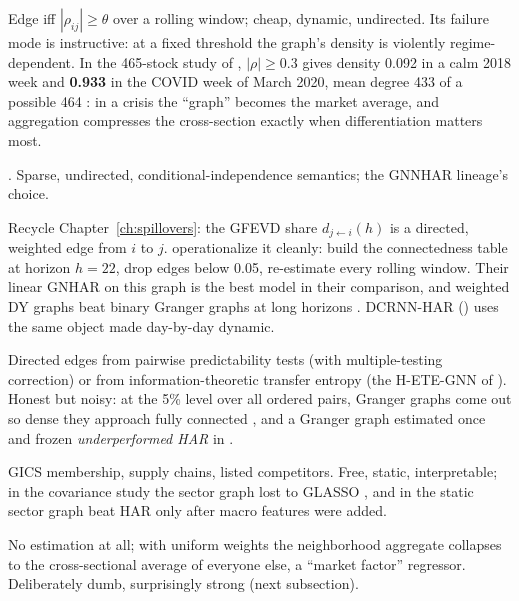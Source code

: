 \begin{description}[nosep]
  \item[Thresholded correlation.] Edge iff $|\rho_{ij}| \ge \theta$ over a rolling window; cheap, dynamic, undirected. Its failure mode is instructive: at a fixed threshold the graph's density is violently regime-dependent. In the 465-stock study of \citet{Wade2026GNNPortfolios}, $|\rho| \ge 0.3$ gives density 0.092 in a calm 2018 week and \textbf{0.933} in the COVID week of March 2020, mean degree 433 of a possible 464 \citep[Table~2, p.~4]{Wade2026GNNPortfolios}: in a crisis the ``graph'' becomes the market average, and aggregation compresses the cross-section exactly when differentiation matters most.
  \item[GLASSO partial correlation.] . Sparse, undirected, conditional-independence semantics; the GNNHAR lineage's choice.
  \item[Diebold--Yilmaz spillover matrix.] Recycle Chapter~\ref{ch:spillovers}: the GFEVD share $d_{j \leftarrow i}(h)$ is a directed, weighted edge from $i$ to $j$. \citet{BoettiNunes2026} operationalize it cleanly: build the connectedness table at horizon $h = 22$, drop edges below 0.05, re-estimate every rolling window. Their linear GNHAR on this graph is the best model in their comparison, and weighted DY graphs beat binary Granger graphs at long horizons \citep[Tables~2--3, pp.~14--15]{BoettiNunes2026}. DCRNN-HAR () uses the same object made day-by-day dynamic.
  \item[Granger causality / transfer entropy.] Directed edges from pairwise predictability tests (with multiple-testing correction) or from information-theoretic transfer entropy (the H-ETE-GNN of ). Honest but noisy: at the 5\% level over all ordered pairs, Granger graphs come out so dense they approach fully connected \citep[Fig.~1, p.~11]{BoettiNunes2026}, and a Granger graph estimated once and frozen \emph{underperformed HAR} in \citet{Wade2026GNNPortfolios}.
  \item[Sector and economic priors.] GICS membership, supply chains, listed competitors. Free, static, interpretable; in the covariance study the sector graph lost to GLASSO \citep[Table~4]{ZhangPuCucuringuDong2024}, and in \citet{Wade2026GNNPortfolios} the static sector graph beat HAR only after macro features were added.
  \item[Fully connected.] No estimation at all; with uniform weights the neighborhood aggregate collapses to the cross-sectional average of everyone else, a ``market factor'' regressor. Deliberately dumb, surprisingly strong (next subsection).

\end{description}
